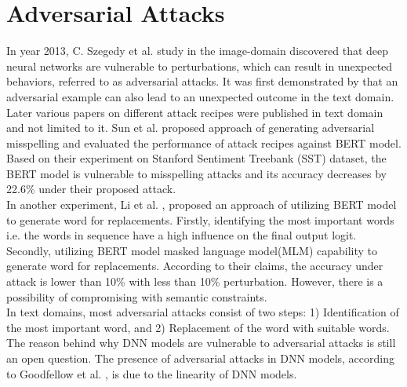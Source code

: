 \documentclass[%
	BCOR=8mm, %
	DIV=12,
	toc=bibliography, %
	toc=listof, %
	oneside, %
	egregdoesnotlikesansseriftitles, %
	]{scrbook}
\begin{document}
\section{Adversarial Attacks}
\label{section:advattacks}
In year 2013, C. Szegedy et al. \cite{szegedy_intriguing_2014} study in the image-domain discovered that deep neural networks are vulnerable to perturbations, which can result in unexpected behaviors, referred to as adversarial attacks. It was first demonstrated by \cite{papernot_crafting_2016} that an adversarial example can also lead to an unexpected outcome in the text domain. Later various papers on different attack recipes were published in text domain \cite{alzantot_generating_2018,li_bert-attack_2020,gao_black-box_2018,li_bert-attack_2020,ren_generating_2019,garg_bae_2020,chen_robustness_2019}  and not limited to it.  Sun et al.  \cite{sun_adv-bert_2020} proposed approach of  generating adversarial misspelling and evaluated the performance of  attack recipes  against BERT model. Based on their experiment on Stanford Sentiment Treebank (SST) dataset, the BERT model is vulnerable to misspelling attacks and its accuracy decreases by 22.6\% under their proposed attack.\\
In another experiment, Li et al. \cite{li_bert-attack_2020}, proposed an approach of utilizing BERT model to generate word for replacements. Firstly, identifying the most important words i.e. the words in sequence have a high influence on the final output logit. Secondly, utilizing BERT model masked language model(MLM) capability to generate word for replacements. According to their claims, the accuracy under attack is lower than 10\% with less than 10\% perturbation. However, there is a possibility of compromising with semantic constraints.\\
In text domains, most adversarial attacks consist of two steps: 1) Identification of the most important word, and 2) Replacement of the word with suitable words. The reason behind why DNN models are vulnerable to adversarial attacks is still an open question. The presence of adversarial attacks in DNN models, according to Goodfellow et al. \cite{goodfellow_explaining_2015}, is due to the linearity of DNN models.
\end{document}
